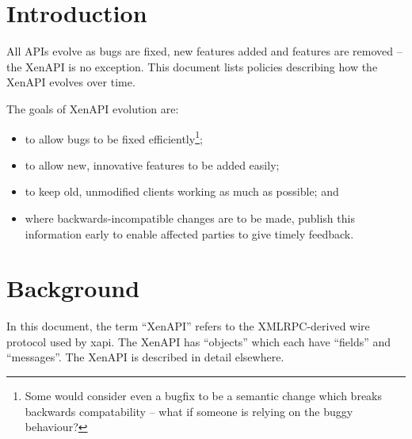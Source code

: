 \documentclass{article}
\begin{document}



\section{Introduction}
All APIs evolve as bugs are fixed, new features added and features are removed -- the XenAPI is no exception. This document lists policies describing how the XenAPI evolves over time.

The goals of XenAPI evolution are:
\begin{itemize}
\item to allow bugs to be fixed efficiently\footnote{Some would consider even a bugfix to be a semantic change which breaks backwards compatability -- what if someone is relying on the buggy behaviour?};
\item to allow new, innovative features to be added easily;
\item to keep old, unmodified clients working as much as possible; and
\item where backwards-incompatible changes are to be made, publish this information early to enable affected parties to give timely feedback.
\end{itemize}

\section{Background}
In this document, the term ``XenAPI'' refers to the XMLRPC-derived wire protocol used by xapi. The XenAPI has ``objects'' which each have ``fields'' and ``messages''. The XenAPI is described in detail elsewhere.
\end{document}
